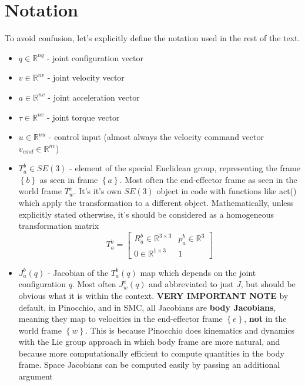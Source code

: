 \section{Notation}
To avoid confusion, let's explicitly define the notation used in the rest of the text.
\begin{itemize}
\item $ q \in \mathbb{R}^{nq} $ - joint configuration vector
\item $ v \in \mathbb{R}^{nv} $ - joint velocity vector
\item $ a \in \mathbb{R}^{nv} $ - joint acceleration vector
\item $ \tau \in \mathbb{R}^{nv} $ - joint torque vector
\item $ u \in \mathbb{R}^{nu} $ - control input (almost always 
	the velocity command vector $ v_{ cmd } \in \mathbb{R}^{nv}  $)
\item $ T_{ a }^{ b } \in SE (3) $ - element of the special Euclidean group,
	representing the frame $ \left\{ b \right\}   $ as seen in frame $ \left\{ a \right\}   $. Most often the end-effector frame as seen in the world frame $ T_{ w }^{ e }  $.
It's it's own $ SE(3)  $ object in code with functions like act() which
apply the transformation to a different object.
Mathematically,
	unless explicitly stated otherwise, it's should be considered as a homogeneous 
	transformation matrix 
	\begin{equation}
	T_{ a }^{ b }= 
	\begin{bmatrix} 
			R_{ a }^{ b } \in \mathbb{R}^{3 \times 3} & p_{ a }^{ b } \in \mathbb{R}^{3} \\
			0 \in \mathbb{R}^{1 \times 3} & 1
	\end{bmatrix} 
	\end{equation}
\item $ J_{ a }^{ b } (q)  $ - Jacobian of the $ T_{ a }^{ b } (q)  $ map
	which depends on the joint configuration $ q  $.
	Most often $ J_{ w }^{ e } (q)  $ and abbreviated to just $ J  $,
	but should be obvious what it is within the context.
	\textbf{VERY IMPORTANT NOTE} by default, in Pinocchio,
	and in SMC, all Jacobians
	are \textbf{body Jacobians}, meaning they map to velocities
	in the end-effector frame $ \left\{ e \right\}   $,
	\textbf{not} in the world frame $ \left\{ w \right\}   $.
	This is because Pinocchio does kinematics and dynamics with the 
	Lie group approach in which body frame are more natural, 
	and because more computationally efficient to
	compute quantities in the body frame.
	Space Jacobians can be computed easily by passing an additional argument

\end{itemize}

